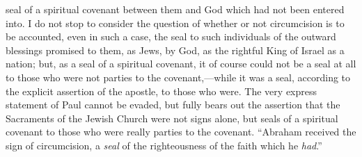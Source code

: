 \documentclass[
]{book}
\begin{document}
seal of a spiritual covenant between them and God which had not been entered into. I do not stop to consider the question of whether or not circumcision is to be accounted, even in such a case, the seal to such individuals of the outward blessings promised to them, as Jews, by God, as the rightful King of Israel as a nation; but, as a seal of a spiritual covenant, it of course could not be a seal at all to those who were not parties to the covenant,---while it was a seal, according to the explicit assertion of the apostle, to those who were. The very express statement of Paul cannot be evaded, but fully bears out the assertion that the Sacraments of the Jewish Church were not signs alone, but seals of a spiritual covenant to those who were really parties to the covenant. ``Abraham received the sign of circumcision, a \emph{seal} of the righteousness of the faith which he \emph{had}.''
\end{document}
